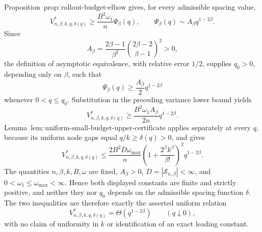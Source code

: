 Proposition~\(\mathrm{prop{:}rollout\text{-}budget\text{-}elbow}\) gives, for every admissible spacing value,
\[
V^*_{n,\beta,k,q,\delta(q)}
\ge \frac{B^2\omega_1}{n}\Psi_\beta(q),
\qquad
\Psi_\beta(q)\sim A_\beta q^{1-2\beta}.
\]
Since
\[
A_\beta=\frac{2\beta-1}{\beta^2}
\binom{2\beta-2}{\beta-1}^{\!2}>0,
\]
the definition of asymptotic equivalence, with relative error \(1/2\), supplies \(q_0>0\), depending only on \(\beta\), such that
\[
\Psi_\beta(q)\ge \frac{A_\beta}{2}q^{1-2\beta}
\]
whenever \(0<q\le q_0\). Substitution in the preceding variance lower bound yields
\[
V^*_{n,\beta,k,q,\delta(q)}
\ge \frac{B^2\omega_1A_\beta}{2n}q^{1-2\beta}.
\]
Lemma~\(\mathrm{lem{:}uniform\text{-}small\text{-}budget\text{-}upper\text{-}certificate}\) applies separately at every \(q\), because its uniform node gaps equal \(q/k\ge\delta(q)>0\), and gives
\[
V^*_{n,\beta,k,q,\delta(q)}
\le \frac{2B^2D\omega_{\max}}{n}
\left(1+\frac{2^\beta k^\beta}{\beta!}\right)^2q^{1-2\beta}.
\]
The quantities \(n,\beta,k,B,\omega\) are fixed, \(A_\beta>0\), \(D=|\mathcal S_{n,\beta}|<\infty\), and \(0<\omega_1\le\omega_{\max}<\infty\). Hence both displayed constants are finite and strictly positive, and neither they nor \(q_0\) depends on the admissible spacing function \(\delta\). The two inequalities are therefore exactly the asserted uniform relation
\[
V^*_{n,\beta,k,q,\delta(q)}=\Theta\!\left(q^{1-2\beta}\right)
\qquad(q\downarrow0),
\]
with no claim of uniformity in \(k\) or identification of an exact leading constant.